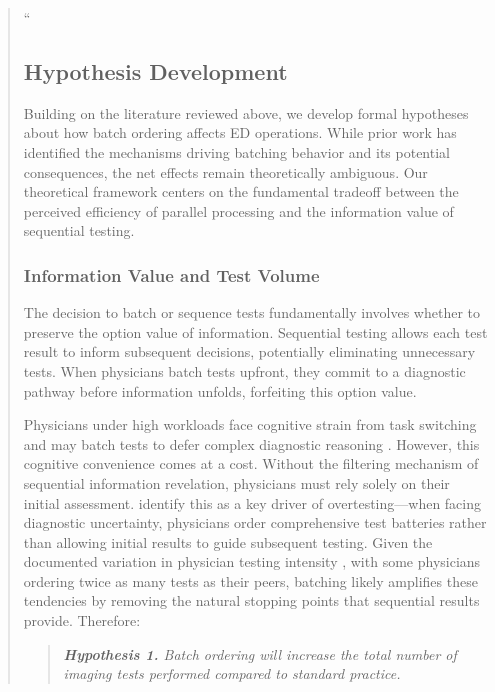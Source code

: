 \documentclass[11pt]{article}
\newcommand{\1}{\hbox{\rm 1\kern-.35em 1}}
\begin{document}
\begin{quote}
``\subsection*{Hypothesis Development}

Building on the literature reviewed above, we develop formal hypotheses about how batch ordering affects ED operations. While prior work has identified the mechanisms driving batching behavior and its potential consequences, the net effects remain theoretically ambiguous. Our theoretical framework centers on the fundamental tradeoff between the perceived efficiency of parallel processing and the information value of sequential testing.

\subsubsection*{Information Value and Test Volume}

The decision to batch or sequence tests fundamentally involves whether to preserve the option value of information. Sequential testing allows each test result to inform subsequent decisions, potentially eliminating unnecessary tests. When physicians batch tests upfront, they commit to a diagnostic pathway before information unfolds, forfeiting this option value.

Physicians under high workloads face cognitive strain from task switching and may batch tests to defer complex diagnostic reasoning \citep{kc2013does, skaugset2016can}. However, this cognitive convenience comes at a cost. Without the filtering mechanism of sequential information revelation, physicians must rely solely on their initial assessment. \cite{lam2020why} identify this as a key driver of overtesting---when facing diagnostic uncertainty, physicians order comprehensive test batteries rather than allowing initial results to guide subsequent testing. Given the documented variation in physician testing intensity \citep{hodgson2018are}, with some physicians ordering twice as many tests as their peers, batching likely amplifies these tendencies by removing the natural stopping points that sequential results provide. Therefore:

\begin{quote}
\small
\textit{\textbf{Hypothesis 1.} Batch ordering will increase the total number of imaging tests performed compared to standard practice.}
\end{quote}


\end{quote}
\end{document}
